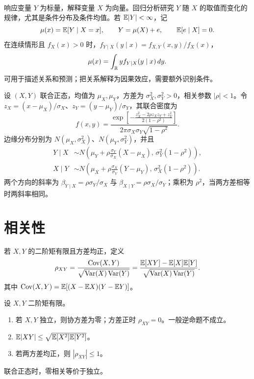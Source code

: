 \begin{definition}\label{reg:entry:1}
响应变量 $Y$ 为标量，解释变量 $X$ 为向量。回归分析研究 $Y$ 随 $X$ 的取值而变化的规律，尤其是条件分布及条件均值。若 $\mathbb{E}|Y|<\infty$，记
\[\mu(x)=\mathbb{E}[Y\mid X=x],\qquad Y=\mu(X)+e,\qquad \mathbb{E}[e\mid X]=0.\]
在连续情形且 $f_X(x)>0$ 时，$f_{Y\mid X}(y\mid x)=f_{X,Y}(x,y)/f_X(x)$，
\[\mu(x)=\int_{\mathbb{R}}y f_{Y\mid X}(y\mid x)\,dy.\]
可用于描述关系和预测；把关系解释为因果效应，需要额外识别条件。
\end{definition}

\begin{proposition}[二元正态的回归关系]\label{reg:entry:2}
设 $(X,Y)$ 联合正态，均值为 $\mu_X,\mu_Y$，方差为 $\sigma_X^2,\sigma_Y^2>0$，相关参数 $|\rho|<1$。令 $z_X=(x-\mu_X)/\sigma_X$、$z_Y=(y-\mu_Y)/\sigma_Y$，其联合密度为
\[f(x,y)=\frac{\exp\!\left[-\frac{z_X^2-2\rho z_Xz_Y+z_Y^2}{2(1-\rho^2)}\right]}{2\pi\sigma_X\sigma_Y\sqrt{1-\rho^2}}.\]
边缘分布分别为 $N(\mu_X,\sigma_X^2)$、$N(\mu_Y,\sigma_Y^2)$，并且
\begin{align*}
Y\mid X&\sim N\!\left(\mu_Y+\rho\frac{\sigma_Y}{\sigma_X}(X-\mu_X),\,\sigma_Y^2(1-\rho^2)\right),\\
X\mid Y&\sim N\!\left(\mu_X+\rho\frac{\sigma_X}{\sigma_Y}(Y-\mu_Y),\,\sigma_X^2(1-\rho^2)\right).
\end{align*}
两个方向的斜率为 $\beta_{Y\mid X}=\rho\sigma_Y/\sigma_X$ 与 $\beta_{X\mid Y}=\rho\sigma_X/\sigma_Y$；乘积为 $\rho^2$，当两方差相等时两斜率相同。
\end{proposition}

\section{相关性}

\begin{definition}[相关系数]\label{reg:entry:3}
若 $X,Y$ 的二阶矩有限且方差均正，定义
\[\rho_{XY}=\frac{\operatorname{Cov}(X,Y)}{\sqrt{\operatorname{Var}(X)\operatorname{Var}(Y)}}
=\frac{\mathbb{E}[XY]-\mathbb{E}[X]\mathbb{E}[Y]}{\sqrt{\operatorname{Var}(X)\operatorname{Var}(Y)}}.\]
其中 $\operatorname{Cov}(X,Y)=\mathbb{E}[(X-\mathbb{E} X)(Y-\mathbb{E} Y)]$。
\end{definition}

\begin{theorem}\label{reg:entry:4}
设 $X,Y$ 二阶矩有限。
\begin{enumerate}
\item 若 $X,Y$ 独立，则协方差为零；方差正时 $\rho_{XY}=0$。一般逆命题不成立。
\item $\mathbb{E}|XY|\leq\sqrt{\mathbb{E}[X^2]\mathbb{E}[Y^2]}$。
\item 若两方差均正，则 $|\rho_{XY}|\leq1$。
\end{enumerate}
联合正态时，零相关等价于独立。
\end{theorem}

